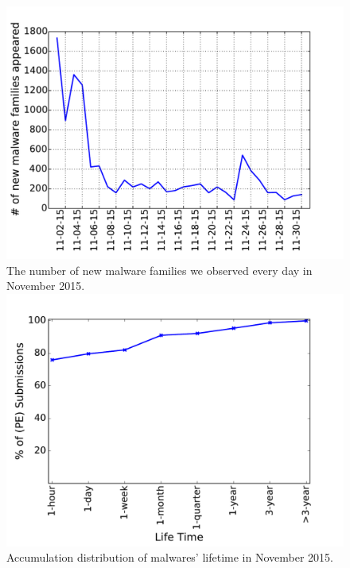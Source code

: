 \begin{figure}[!htb]
  \includegraphics[width=\linewidth]{figure/new_family}
{
The number of new malware families we observed every day in November 2015.
}
\endminipage\hfill
{}
  \includegraphics[width=\linewidth]{figure/lifetime}
{
Accumulation distribution of malwares' lifetime in November 2015.
}
\endminipage\hfill
{}%

\end{figure}
